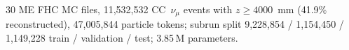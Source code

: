 30 ME FHC MC files, 11{,}532{,}532 CC~$\nu_\mu$ events with $z \ge 4000$~mm (41.9\% reconstructed), 47{,}005{,}844 particle tokens; subrun split 9{,}228{,}854 / 1{,}154{,}450 / 1{,}149{,}228 train / validation / test; 3.85\,M parameters.
